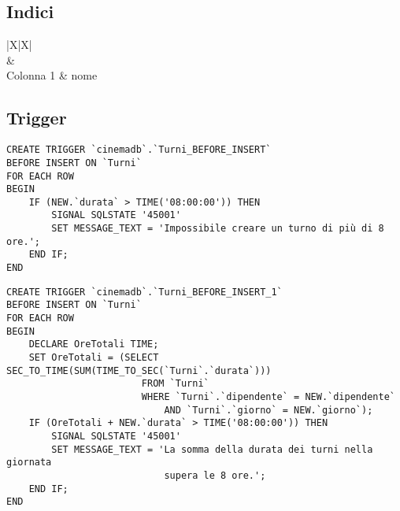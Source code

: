 \subsection*{Indici}
%
%
\begin{tabularx}{\linewidth}{|X|X|}
    \hline
     \\\hline
     & 
    \\\hline
    Colonna 1
     & \textlangle{}nome\textrangle{}
    \\ \hline
\end{tabularx}

\subsection*{Trigger}
%
%

\begin{verbatim}
CREATE TRIGGER `cinemadb`.`Turni_BEFORE_INSERT`
BEFORE INSERT ON `Turni`
FOR EACH ROW
BEGIN
    IF (NEW.`durata` > TIME('08:00:00')) THEN
        SIGNAL SQLSTATE '45001'
        SET MESSAGE_TEXT = 'Impossibile creare un turno di più di 8 ore.';
    END IF;
END
\end{verbatim}

\begin{verbatim}
CREATE TRIGGER `cinemadb`.`Turni_BEFORE_INSERT_1` 
BEFORE INSERT ON `Turni` 
FOR EACH ROW
BEGIN
    DECLARE OreTotali TIME;
    SET OreTotali = (SELECT SEC_TO_TIME(SUM(TIME_TO_SEC(`Turni`.`durata`)))
                        FROM `Turni`
                        WHERE `Turni`.`dipendente` = NEW.`dipendente`
                            AND `Turni`.`giorno` = NEW.`giorno`);
    IF (OreTotali + NEW.`durata` > TIME('08:00:00')) THEN
        SIGNAL SQLSTATE '45001'
        SET MESSAGE_TEXT = 'La somma della durata dei turni nella giornata
                            supera le 8 ore.';
    END IF;
END
\end{verbatim}

